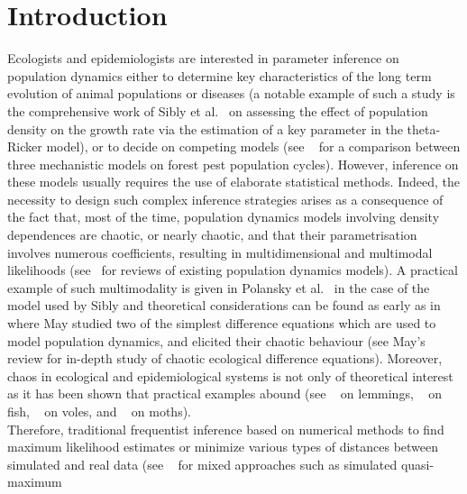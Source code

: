 \documentclass[12pt]{article}
\begin{document}
	\newpage
	
	{\hypersetup{hidelinks}
	\listoffigures
	}
	{\hypersetup{hidelinks}
	\listoftables
	}
	\clearpage
	{\hypersetup{hidelinks}
		\tableofcontents
	}
	
	\clearpage
	\section{Introduction}
	Ecologists and epidemiologists are interested in parameter inference on population dynamics either to determine key characteristics of the long term evolution of animal populations or diseases (a notable example of such a study is the comprehensive work of Sibly et al.~\cite{sibly2005regulation} on assessing the effect of population density on the growth rate via the estimation of a key parameter in the theta-Ricker model), or to decide on competing models (see ~\cite{kendall2005population} for a comparison between three mechanistic models on forest pest population cycles). However, inference on these models usually requires the use of elaborate statistical methods. Indeed, the necessity to design such complex inference strategies arises as a consequence of the fact that, most of the time, population dynamics models involving density dependences are chaotic, or nearly chaotic, and that their parametrisation involves numerous coefficients, resulting in multidimensional and multimodal likelihoods (see~\cite{hanski1990density, woiwod1992patterns, turchin2003complex, brook2006strength} for reviews of existing population dynamics models). A practical example of such multimodality is given in Polansky et al.~\cite{polansky2009likelihood} in the case of the model used by Sibly and theoretical considerations can be found as early as in \cite{may1975biological} where May studied two of the simplest difference equations which are used to model population dynamics, and elicited their chaotic behaviour (see May's~\cite{may1986search, may1989chaotic} review for in-depth study of chaotic ecological difference equations). Moreover, chaos in ecological and epidemiological systems is not only of theoretical interest as it has been shown that practical examples abound (see ~\cite{kausrud2008linking} on lemmings, ~\cite{anderson2008fishing} on fish, ~\cite{turchin2000living} on voles, and ~\cite{kendall2005population} on moths). \\
	Therefore, traditional frequentist inference based on numerical methods to find maximum likelihood estimates or minimize various types of distances between simulated and real data (see ~\cite{kendall1999populations,kendall2005population} for mixed approaches such as simulated quasi-maximum
\end{document}
